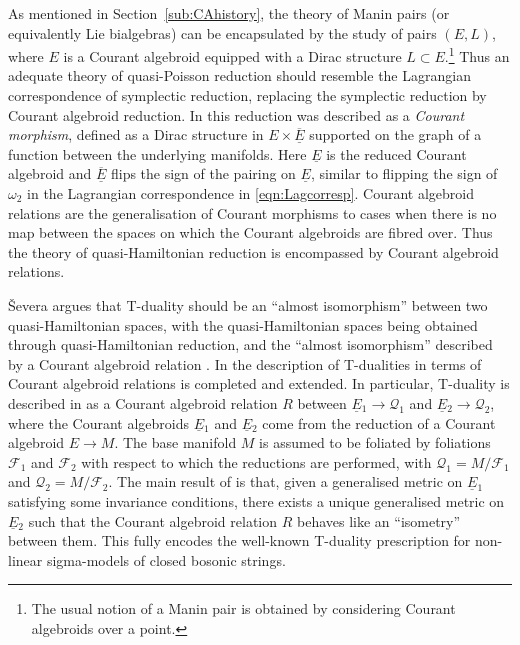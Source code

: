 \documentclass[a4paper, reqno, 11pt]{amsart}
\numberwithin{equation}{section}
\theoremstyle{definition}
\newcommand{\red}[1]{\underline{#1}}
\newcommand{\cQ}{{\mathcal Q}}
\newcommand{\cF}{{\mathcal F}}
\theoremstyle{remark}
\begin{document}
As mentioned in Section~\ref{sub:CAhistory}, the theory of Manin pairs (or equivalently Lie bialgebras) can be encapsulated by the study of pairs $(E,L)$, where $E$ is a Courant algebroid equipped with a Dirac structure $L\subset E$.\footnote{The usual notion of a Manin pair is obtained by considering Courant algebroids over a point.} Thus an adequate theory of quasi-Poisson reduction should resemble the Lagrangian correspondence of symplectic reduction, replacing the symplectic reduction by Courant algebroid reduction. In \cite{LiBland2009, bursztyn2008courant} this reduction was described as a \emph{Courant morphism}, defined as a Dirac structure in $E \times \overline{\red E}$ supported on the graph of a function between the underlying manifolds. Here $\red E$ is the reduced Courant algebroid and $\overline{\red E}$ flips the sign of the pairing on $\red E$, similar to flipping the sign of $\omega_2$ in the Lagrangian correspondence in \eqref{eqn:Lagcorresp}. 
Courant algebroid relations are the generalisation of Courant morphisms to cases when there is no map between the spaces on which the Courant algebroids are fibred over. Thus the theory of quasi-Hamiltonian reduction is encompassed by Courant algebroid relations. 

{\v S}evera argues that T-duality should be an \enquote{almost isomorphism} between two quasi-Hamiltonian spaces,  with the quasi-Hamiltonian spaces being obtained through quasi-Hamiltonian reduction, and the \enquote{almost isomorphism} described by a Courant algebroid relation \cite{Severa-unpubl}. In \cite{DeFraja:2023fhe, Vysoky2020hitchiker} the description of T-dualities in terms of Courant algebroid relations is completed and extended. In particular, T-duality is described in \cite{DeFraja:2023fhe} as a Courant algebroid relation $R$ between $\red E{}_1 \to \cQ_1$ and $\red E{}_2 \to \cQ_2$, where the Courant algebroids $\red E{}_1$ and $\red E{}_2$ come from the reduction of a Courant algebroid $E \to M$. The base manifold $M$ is assumed to be foliated by foliations $\cF_1$ and $\cF_2$ with respect to which the reductions are performed, with $\cQ_1=M/\cF_1$ and $\cQ_2=M/\cF_2$. The main result of \cite{DeFraja:2023fhe} is that, given a generalised metric on $\red E{}_1$ satisfying some invariance conditions, there exists a unique generalised metric on $\red E{}_2$ such that the Courant algebroid relation $R$ behaves like an ``isometry'' between them. This fully encodes the well-known T-duality prescription for non-linear sigma-models of closed bosonic strings.
\end{document}
